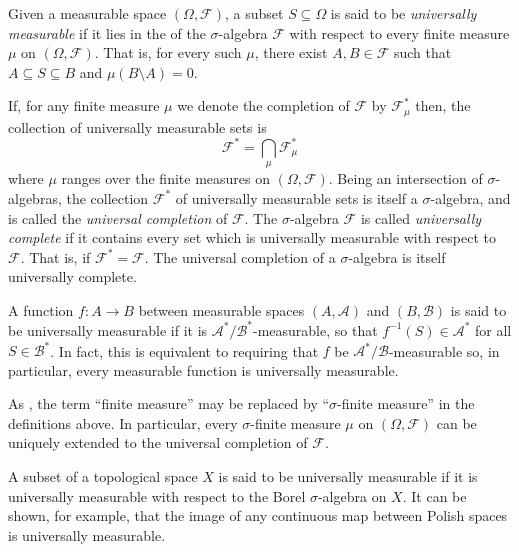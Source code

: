 \documentclass[12pt]{article}
\begin{document}
Given a measurable space $(\Omega,\mathcal{F})$, a subset $S\subseteq\Omega$ is said to be \emph{universally measurable} if it lies in the  of the $\sigma$-algebra $\mathcal{F}$ with respect to every finite measure $\mu$ on $(\Omega,\mathcal{F})$.
That is, for every such $\mu$, there exist $A,B\in\mathcal{F}$ such that $A\subseteq S\subseteq B$ and $\mu(B\setminus A)=0$.

If, for any finite measure $\mu$ we denote the completion of $\mathcal{F}$ by $\mathcal{F}^*_\mu$ then, the collection of universally measurable sets is
\begin{equation*}
\mathcal{F}^*=\bigcap_\mu\mathcal{F}^*_\mu
\end{equation*}
where $\mu$ ranges over the finite measures on $(\Omega,\mathcal{F})$.
Being an intersection of $\sigma$-algebras, the collection $\mathcal{F}^*$ of universally measurable sets is itself a $\sigma$-algebra, and is called the \emph{universal completion} of $\mathcal{F}$.
The $\sigma$-algebra $\mathcal{F}$ is called \emph{universally complete} if it contains every set which is universally measurable with respect to $\mathcal{F}$. That is, if $\mathcal{F}^*=\mathcal{F}$. The universal completion of a $\sigma$-algebra is itself universally complete.

A function $f\colon A\rightarrow B$ between measurable spaces $(A,\mathcal{A})$ and $(B,\mathcal{B})$ is said to be universally measurable if it is $\mathcal{A}^*/\mathcal{B}^*$-measurable, so that $f^{-1}(S)\in\mathcal{A}^*$ for all $S\in\mathcal{B}^*$. In fact, this is equivalent to requiring that $f$ be $\mathcal{A}^*/\mathcal{B}$-measurable so, in particular, every measurable function is universally measurable.

As , the term ``finite measure'' may be replaced by ``$\sigma$-finite measure'' in the definitions above.
In particular, every $\sigma$-finite measure $\mu$ on $(\Omega,\mathcal{F})$ can be uniquely extended to the universal completion of $\mathcal{F}$.

A subset of a topological space $X$ is said to be universally measurable if it is universally measurable with respect to the Borel $\sigma$-algebra on $X$. It can be shown, for example, that the image of any continuous map between Polish spaces is universally measurable.
\end{document}
